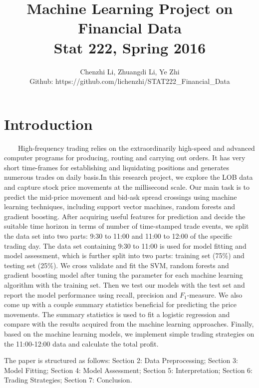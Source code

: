 \documentclass[11pt]{article}
\title{Machine Learning Project on Financial Data\\
  Stat 222, Spring 2016}
\author{
  Chenzhi Li, Zhuangdi Li, Ye Zhi \\
  Github: https://github.com/lichenzhi/STAT222\_Financial\_Data
}
\begin{document}
\maketitle




\section{Introduction}
\ \ \ \ High-frequency trading relies on the extraordinarily high-speed and advanced computer programs for producing, routing and carrying out orders. It has very short time-frames for establishing and liquidating positions and generates numerous trades on daily basis\cite{hft}.In this research project, we explore the LOB data and capture stock price movements at the millisecond scale. Our main task is to predict the mid-price movement and bid-ask spread crossings using machine learning techniques, including support vector machines, random forests and gradient boosting. After acquiring useful features for prediction and decide the suitable time horizon in terms of number of time-stamped trade events, we split the data set into two parts: 9:30 to 11:00 and 11:00 to 12:00 of the specific trading day. The data set containing 9:30 to 11:00 is used for model fitting and model assessment, which is further split into two parts: training set (75\%) and testing set (25\%). We cross validate and fit the SVM, random forests and gradient boosting model after tuning the parameter for each machine learning algorithm with the training set. Then we test our models with the test set and report the model performance using recall, precision and $F_{1}$-measure. We also come up with a couple summary statistics beneficial for predicting the price movements. The summary statistics is used to fit a logistic regression and compare with the results acquired from the machine learning approaches. Finally, based on the machine learning models, we implement simple trading strategies on the 11:00-12:00 data and calculate the total profit. 
\par
The paper is structured as follows: Section 2: Data Preprocessing; Section 3: Model Fitting; Section 4: Model Assessment; Section 5: Interpretation; Section 6: Trading Strategies; Section 7: Conclusion.
\end{document}
